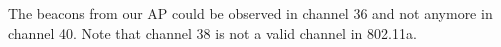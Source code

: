 The beacons from our AP could be observed in channel 36 and not anymore in channel 40. Note that channel 38 is not a valid channel in 802.11a.
